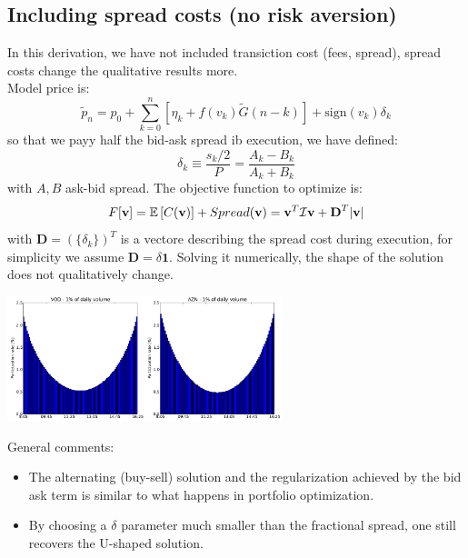 \subsection{Including spread costs (no risk aversion)}
In this derivation, we have not included transiction cost (fees, spread), spread costs change the qualitative results more.\\
Model price is:
\[
\tilde{p}_n = p_0 + \sum_{k=0}^{n} [\eta_k + f(v_k) \tilde{G}(n-k)] + \text{sign}(v_k)\delta_k
\]
so that we payy half the bid-ask spread ib execution, we have defined:
\[
\delta_k \equiv \frac{s_k/2}{P} = \frac{A_k-B_k}{A_k+B_k}
\]
with $A,B$ ask-bid spread. The objective function to optimize is:
\[
F[\textbf{v}] = \mathbb{E}\left[C(\textbf{v})\right] + Spread(\textbf{v}) = \textbf{v}^T \mathcal{I}\textbf{v} + \textbf{D}^T |\textbf{v}|
\]
with $\textbf{D} = (\{\delta_k\})^T$ is a vectore describing the spread cost during execution, for simplicity we assume $\textbf{D} = \delta \textbf{1}$. Solving it numerically, the shape of the solution does not qualitatively change.
\begin{center}
	\includegraphics[width=0.6\textwidth]{picture/(15)solution_u_term_transiction.png}
\end{center}
General comments:
\begin{itemize}
	\item The alternating (buy-sell) solution and the regularization achieved by the bid ask
	term is similar to what happens in portfolio optimization.
	\item By choosing a $\delta$ parameter much smaller than the fractional spread, one still
	recovers the U-shaped solution.
\end{itemize}
